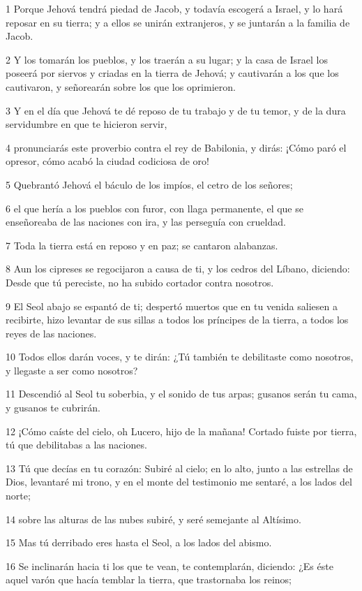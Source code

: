 \par 1 Porque Jehová tendrá piedad de Jacob, y todavía escogerá a Israel, y lo hará reposar en su tierra; y a ellos se unirán extranjeros, y se juntarán a la familia de Jacob.
\par 2 Y los tomarán los pueblos, y los traerán a su lugar; y la casa de Israel los poseerá por siervos y criadas en la tierra de Jehová; y cautivarán a los que los cautivaron, y señorearán sobre los que los oprimieron.
\par 3 Y en el día que Jehová te dé reposo de tu trabajo y de tu temor, y de la dura servidumbre en que te hicieron servir,
\par 4 pronunciarás este proverbio contra el rey de Babilonia, y dirás: ¡Cómo paró el opresor, cómo acabó la ciudad codiciosa de oro!
\par 5 Quebrantó Jehová el báculo de los impíos, el cetro de los señores;
\par 6 el que hería a los pueblos con furor, con llaga permanente, el que se enseñoreaba de las naciones con ira, y las perseguía con crueldad.
\par 7 Toda la tierra está en reposo y en paz; se cantaron alabanzas.
\par 8 Aun los cipreses se regocijaron a causa de ti, y los cedros del Líbano, diciendo: Desde que tú pereciste, no ha subido cortador contra nosotros.
\par 9 El Seol abajo se espantó de ti; despertó muertos que en tu venida saliesen a recibirte, hizo levantar de sus sillas a todos los príncipes de la tierra, a todos los reyes de las naciones.
\par 10 Todos ellos darán voces, y te dirán: ¿Tú también te debilitaste como nosotros, y llegaste a ser como nosotros?
\par 11 Descendió al Seol tu soberbia, y el sonido de tus arpas; gusanos serán tu cama, y gusanos te cubrirán.
\par 12 ¡Cómo caíste del cielo, oh Lucero, hijo de la mañana! Cortado fuiste por tierra, tú que debilitabas a las naciones.
\par 13 Tú que decías en tu corazón: Subiré al cielo; en lo alto, junto a las estrellas de Dios, levantaré mi trono, y en el monte del testimonio me sentaré, a los lados del norte;
\par 14 sobre las alturas de las nubes subiré, y seré semejante al Altísimo.
\par 15 Mas tú derribado eres hasta el Seol, a los lados del abismo.
\par 16 Se inclinarán hacia ti los que te vean, te contemplarán, diciendo: ¿Es éste aquel varón que hacía temblar la tierra, que trastornaba los reinos;
